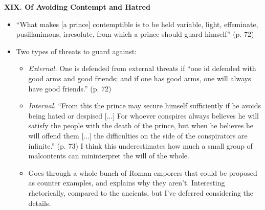 \documentclass[10pt]{article}
\newcommand{\comment}[1]{{\color{Cerulean}#1}}
\begin{document}
\textbf{XIX. Of Avoiding Contempt and Hatred}
\begin{itemize}
\item 
    ``What makes [a prince] contemptible is to be held variable,
    light, effeminate, pusillanimous, irresolute, from which a prince
    should guard himself'' (p. 72)
\item
    Two types of threats to guard against:
    \begin{itemize}
    \item 
        \textsl{External.} One is defended from external threats if
        ``one id defended with good arms and good friends; and if one
        has good arms, one will always have good friends.'' (p. 72)
    \item
        \textsl{Internal.} ``From this the prince may secure himself
        sufficiently if he avoids being hated or despised [...]
        For whoever conspires always believes he will satisfy the people
        with the death of the prince, but when he believes he will offend
        them [...] the difficulties on the side of the conspirators are
        infinite.'' (p. 73) 
        \comment{I think this underestimates how much a small group
        of malcontents can mininterpret the will of the whole.}
    \item 
        Goes through a whole bunch of Roman emporers that could be
        proposed as counter examples, and explains why they aren't.
        Interesting rhetorically, compared to the ancients, but I've
        deferred considering the details.
    \end{itemize}
\end{itemize}
\end{document}
